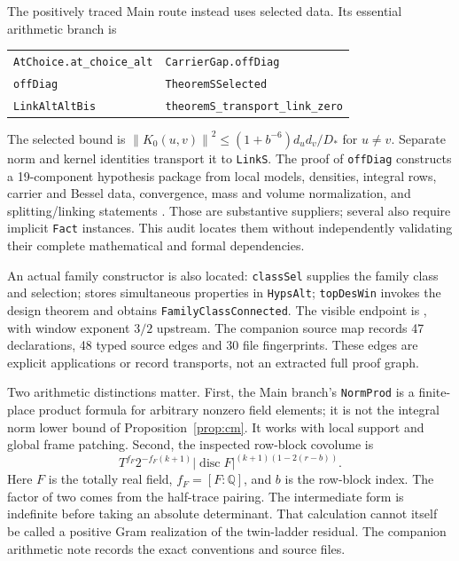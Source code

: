 \documentclass[11pt,letterpaper]{article}
\theoremstyle{definition}
\theoremstyle{remark}
\newcommand{\Q}{\mathbb Q}
\newcommand{\norm}[1]{\left\lVert#1\right\rVert}
\numberwithin{equation}{section}
\begin{document}
The positively traced Main route instead uses selected data. Its essential arithmetic branch is
\begin{center}\small
\begin{tabular}{@{}l@{\ $\longrightarrow$\ }l@{}}
\texttt{AtChoice.at\_choice\_alt} & \texttt{CarrierGap.offDiag}\\
\texttt{offDiag} & \texttt{TheoremSSelected}\\
\texttt{LinkAltAltBis} & \texttt{theoremS\_transport\_link\_zero}
\end{tabular}
\end{center}
The selected bound is $\norm{K_0(u,v)}^2\le(1+b^{-6})d_ud_v/D_*$ for $u\ne v$. Separate norm and kernel identities transport it to \texttt{LinkS}. The proof of \texttt{offDiag} constructs a 19-component hypothesis package from local models, densities, integral rows, carrier and Bessel data, convergence, mass and volume normalization, and splitting/linking statements \cite{selected}. Those are substantive suppliers; several also require implicit \texttt{Fact} instances. This audit locates them without independently validating their complete mathematical and formal dependencies.

An actual family constructor is also located: \texttt{classSel} supplies the family class and selection;  stores simultaneous properties in \texttt{HypsAlt}; \texttt{topDesWin} invokes the design theorem and obtains \texttt{FamilyClassConnected}. The visible endpoint is , with window exponent $3/2$ upstream. The companion source map records 47 declarations, 48 typed source edges and 30 file fingerprints. These edges are explicit applications or record transports, not an extracted full proof graph.

Two arithmetic distinctions matter. First, the Main branch's \texttt{NormProd} is a finite-place product formula for arbitrary nonzero field elements; it is not the integral norm lower bound of Proposition~\ref{prop:cm}. It works with local support and global frame patching. Second, the inspected row-block covolume is
\[
 T^{f_F}2^{-f_F(k+1)}|\operatorname{disc}F|^{(k+1)(1-2(r-b))}.
\]
Here $F$ is the totally real field, $f_F=[F:\Q]$, and $b$ is the row-block index. The factor of two comes from the half-trace pairing. The intermediate form is indefinite before taking an absolute determinant. That calculation cannot itself be called a positive Gram realization of the twin-ladder residual. The companion arithmetic note records the exact conventions and source files.
\end{document}

